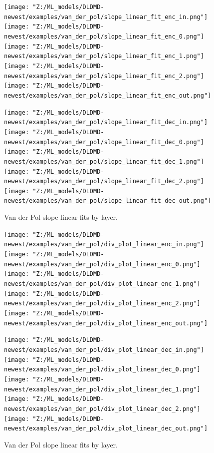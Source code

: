 \begin{figure}[p]
    \centering
    \begin{minipage}{.5\textwidth}
        \texttt{[image: "Z:/ML\_models/DLDMD-newest/examples/van\_der\_pol/slope\_linear\_fit\_enc\_in.png"]} 
        \texttt{[image: "Z:/ML\_models/DLDMD-newest/examples/van\_der\_pol/slope\_linear\_fit\_enc\_0.png"]} 
        \texttt{[image: "Z:/ML\_models/DLDMD-newest/examples/van\_der\_pol/slope\_linear\_fit\_enc\_1.png"]} 
        \texttt{[image: "Z:/ML\_models/DLDMD-newest/examples/van\_der\_pol/slope\_linear\_fit\_enc\_2.png"]} 
        \texttt{[image: "Z:/ML\_models/DLDMD-newest/examples/van\_der\_pol/slope\_linear\_fit\_enc\_out.png"]} 
    \end{minipage}%
    \begin{minipage}{.5\textwidth}
        \texttt{[image: "Z:/ML\_models/DLDMD-newest/examples/van\_der\_pol/slope\_linear\_fit\_dec\_in.png"]} 
        \texttt{[image: "Z:/ML\_models/DLDMD-newest/examples/van\_der\_pol/slope\_linear\_fit\_dec\_0.png"]} 
        \texttt{[image: "Z:/ML\_models/DLDMD-newest/examples/van\_der\_pol/slope\_linear\_fit\_dec\_1.png"]} 
        \texttt{[image: "Z:/ML\_models/DLDMD-newest/examples/van\_der\_pol/slope\_linear\_fit\_dec\_2.png"]} 
        \texttt{[image: "Z:/ML\_models/DLDMD-newest/examples/van\_der\_pol/slope\_linear\_fit\_dec\_out.png"]} 
    \end{minipage}
    \caption{Van der Pol slope linear fits by layer.}
    \label{fig:van der pol slopes all layers}
\end{figure}

\begin{figure}[p]
    \centering
    \begin{minipage}{.5\textwidth}
        \texttt{[image: "Z:/ML\_models/DLDMD-newest/examples/van\_der\_pol/div\_plot\_linear\_enc\_in.png"]} 
        \texttt{[image: "Z:/ML\_models/DLDMD-newest/examples/van\_der\_pol/div\_plot\_linear\_enc\_0.png"]} 
        \texttt{[image: "Z:/ML\_models/DLDMD-newest/examples/van\_der\_pol/div\_plot\_linear\_enc\_1.png"]} 
        \texttt{[image: "Z:/ML\_models/DLDMD-newest/examples/van\_der\_pol/div\_plot\_linear\_enc\_2.png"]} 
        \texttt{[image: "Z:/ML\_models/DLDMD-newest/examples/van\_der\_pol/div\_plot\_linear\_enc\_out.png"]} 
    \end{minipage}%
    \begin{minipage}{.5\textwidth}
        \texttt{[image: "Z:/ML\_models/DLDMD-newest/examples/van\_der\_pol/div\_plot\_linear\_dec\_in.png"]} 
        \texttt{[image: "Z:/ML\_models/DLDMD-newest/examples/van\_der\_pol/div\_plot\_linear\_dec\_0.png"]} 
        \texttt{[image: "Z:/ML\_models/DLDMD-newest/examples/van\_der\_pol/div\_plot\_linear\_dec\_1.png"]} 
        \texttt{[image: "Z:/ML\_models/DLDMD-newest/examples/van\_der\_pol/div\_plot\_linear\_dec\_2.png"]} 
        \texttt{[image: "Z:/ML\_models/DLDMD-newest/examples/van\_der\_pol/div\_plot\_linear\_dec\_out.png"]} 
    \end{minipage}
    \caption{Van der Pol slope linear fits by layer.}
    \label{fig:van der pol linear fits all layers}
\end{figure}

